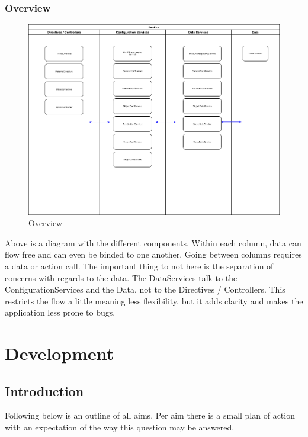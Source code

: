 \subsubsection{Overview}
\begin{figure}
\centering
\includegraphics[width=15cm]{images/dfd}
\caption{Overview}
\label{figure:dfd}
\end{figure}
Above is a diagram with the different components. Within each column, data can flow free and can even be binded to one another. Going between columns requires a data or action call. The important thing to not here is the separation of concerns with regards to the data. The DataServices talk to the ConfigurationServices and the Data, not to the Directives / Controllers. This restricts the flow a little meaning less flexibility, but it adds clarity and makes the application less prone to bugs.


\section{Development}
\subsection{Introduction}
Following below is an outline of all aims. Per aim there is a small plan of action with an expectation of the way this question may be answered.

